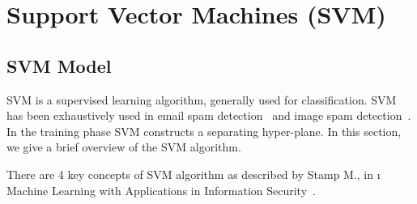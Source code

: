 \chapter{Support Vector Machines (SVM)}
\section{SVM Model}
\par SVM is a supervised learning algorithm, generally used for classification. SVM has been exhaustively used in email spam detection~\cite{2} and image spam detection~\cite{7}. In the training phase SVM constructs a separating hyper-plane. In this section, we give a brief overview of the SVM algorithm.

\par There are 4 key concepts of SVM algorithm as described by Stamp M., in \i{ Machine Learning with Applications in Information Security}~\cite{Stamp_ML}.
